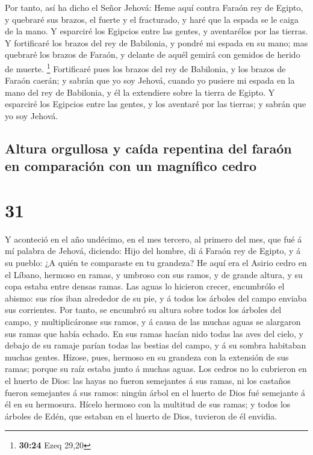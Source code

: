  Por tanto, así ha dicho el Señor Jehová: Heme aquí contra
Faraón rey de Egipto, y quebraré sus brazos, el fuerte y el fracturado,
y haré que la espada se le caiga de la mano.  Y esparciré
los Egipcios entre las gentes, y aventarélos por las tierras.
 Y fortificaré los brazos del rey de Babilonia, y pondré mi
espada en su mano; mas quebraré los brazos de Faraón, y delante de aquél
gemirá con gemidos de herido de muerte. \footnote{\textbf{30:24} Ezeq
  29,20}  Fortificaré pues los brazos del rey de Babilonia,
y los brazos de Faraón caerán; y sabrán que yo soy Jehová, cuando yo
pusiere mi espada en la mano del rey de Babilonia, y él la extendiere
sobre la tierra de Egipto.  Y esparciré los Egipcios entre
las gentes, y los aventaré por las tierras; y sabrán que yo soy Jehová.

\hypertarget{altura-orgullosa-y-cauxedda-repentina-del-farauxf3n-en-comparaciuxf3n-con-un-magnuxedfico-cedro}{%
\subsection{Altura orgullosa y caída repentina del faraón en comparación
con un magnífico
cedro}\label{altura-orgullosa-y-cauxedda-repentina-del-farauxf3n-en-comparaciuxf3n-con-un-magnuxedfico-cedro}}

\hypertarget{section-30}{%
\section{31}\label{section-30}}

 Y aconteció en el año undécimo, en el mes tercero, al
primero del mes, que fué á mí palabra de Jehová, diciendo: 
Hijo del hombre, di á Faraón rey de Egipto, y á su pueblo: ¿A quién te
comparaste en tu grandeza?  He aquí era el Asirio cedro en
el Líbano, hermoso en ramas, y umbroso con sus ramos, y de grande
altura, y su copa estaba entre densas ramas.  Las aguas lo
hicieron crecer, encumbrólo el abismo: sus ríos iban alrededor de su
pie, y á todos los árboles del campo enviaba sus corrientes.
 Por tanto, se encumbró su altura sobre todos los árboles
del campo, y multiplicáronse sus ramos, y á causa de las muchas aguas se
alargaron sus ramas que había echado.  En sus ramas hacían
nido todas las aves del cielo, y debajo de su ramaje parían todas las
bestias del campo, y á su sombra habitaban muchas gentes. 
Hízose, pues, hermoso en su grandeza con la extensión de sus ramas;
porque su raíz estaba junto á muchas aguas.  Los cedros no
lo cubrieron en el huerto de Dios: las hayas no fueron semejantes á sus
ramas, ni los castaños fueron semejantes á sus ramos: ningún árbol en el
huerto de Dios fué semejante á él en su hermosura.  Hícelo
hermoso con la multitud de sus ramas; y todos los árboles de Edén, que
estaban en el huerto de Dios, tuvieron de él envidia.

